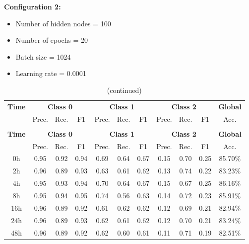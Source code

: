 \documentclass[12pt,oneside]{book} %
\begin{document}
\noindent \textbf{Configuration 2:}
\begin{multicols}{2}
    \begin{itemize}
        \item Number of hidden nodes = 100
        \item Number of epochs = 20
    \end{itemize}
    \begin{itemize}
         \item Batch size = 1024
         \item Learning rate = 0.0001
    \end{itemize}
\end{multicols}

\setlength\LTleft{1cm}
\begin{longtable}{ c ccc ccc ccc c}
\caption{Performance metrics of the LNN model for configuration 2} \\
\toprule
\textbf{Time} & \multicolumn{3}{c}{\textbf{Class 0}} & \multicolumn{3}{c}{\textbf{Class 1}} & \multicolumn{3}{c}{\textbf{Class 2}} & \textbf{Global} \\
               & Prec. & Rec. & F1  & Prec. & Rec. & F1   & Prec. & Rec. & F1  & Acc. \\
\midrule
\endfirsthead

\caption[]{(continued)} \\
\toprule
\textbf{Time} & \multicolumn{3}{c}{\textbf{Class 0}} & \multicolumn{3}{c}{\textbf{Class 1}} & \multicolumn{3}{c}{\textbf{Class 2}} & \textbf{Global} \\
               & Prec. & Rec. & F1  & Prec. & Rec. & F1   & Prec. & Rec. & F1  & Acc. \\
\midrule
\endhead

\bottomrule
\endfoot

\bottomrule
\endlastfoot

0h             & 0.95  & 0.92 & 0.94 & 0.69  & 0.64 & 0.67  & 0.15  & 0.70 & 0.25 & 85.70\% \\
2h             & 0.96  & 0.89 & 0.93 & 0.63  & 0.61 & 0.62  & 0.13  & 0.74 & 0.22 & 83.23\% \\
4h             & 0.95  & 0.93 & 0.94 & 0.70  & 0.64 & 0.67  & 0.15  & 0.67 & 0.25 & 86.16\% \\
8h             & 0.95  & 0.94 & 0.95 & 0.74  & 0.56 & 0.63  & 0.14  & 0.72 & 0.23 & 85.91\% \\
16h            & 0.96  & 0.89 & 0.92 & 0.61  & 0.62 & 0.62  & 0.12  & 0.69 & 0.21 & 82.94\% \\
24h            & 0.96  & 0.89 & 0.93 & 0.62  & 0.61 & 0.62  & 0.12  & 0.70 & 0.21 & 83.24\% \\
48h            & 0.96  & 0.89 & 0.92 & 0.62  & 0.60 & 0.61  & 0.11  & 0.71 & 0.19 & 82.51\% \\
\end{longtable}
\end{document}
